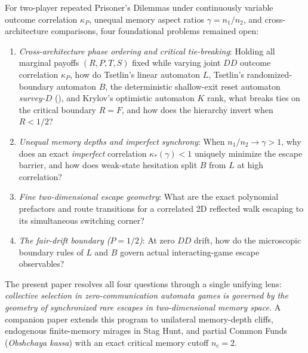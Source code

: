 \documentclass[11pt,reqno]{amsart}
\theoremstyle{definition}
\theoremstyle{remark}
\begin{document}
For two-player repeated Prisoner's Dilemmas under continuously variable outcome correlation $\kappa_P$, unequal memory aspect ratios $\gamma = n_1/n_2$, and cross-architecture comparisons, four foundational problems remained open:
\begin{enumerate}
  \item \emph{Cross-architecture phase ordering and critical tie-breaking}: Holding all marginal payoffs $(R,P,T,S)$ fixed while varying joint $DD$ outcome correlation $\kappa_P$, how do Tsetlin's linear automaton $L$, Tsetlin's randomized-boundary automaton $B$, the deterministic shallow-exit reset automaton \emph{survey-$D$} (\cite[\S 2]{Tsetlin1963}), and Krylov's optimistic automaton $K$ rank, what breaks ties on the critical boundary $R=F$, and how does the hierarchy invert when $R < 1/2$?
  \item \emph{Unequal memory depths and imperfect synchrony}: When $n_1/n_2 \to \gamma > 1$, why does an exact \emph{imperfect} correlation $\kappa_*(\gamma) < 1$ uniquely minimize the escape barrier, and how does weak-state hesitation split $B$ from $L$ at high correlation?
  \item \emph{Fine two-dimensional escape geometry}: What are the exact polynomial prefactors and route transitions for a correlated 2D reflected walk escaping to its simultaneous switching corner?
  \item \emph{The fair-drift boundary ($P = 1/2$)}: At zero $DD$ drift, how do the microscopic boundary rules of $L$ and $B$ govern actual interacting-game escape observables?
\end{enumerate}

The present paper resolves all four questions through a single unifying lens: \emph{collective selection in zero-communication automata games is governed by the geometry of synchronized rare escapes in two-dimensional memory space.} A companion paper \cite{Paper2} extends this program to unilateral memory-depth cliffs, endogenous finite-memory mirages in Stag Hunt, and partial Common Funds (\emph{Obshchaya kassa}) with an exact critical memory cutoff $n_c = 2$.
\end{document}

